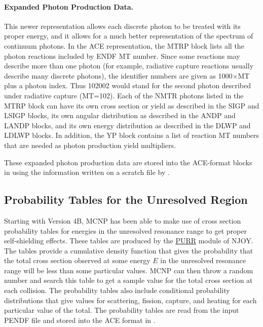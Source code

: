 \paragraph{Expanded Photon Production Data.}
This newer representation allows each discrete photon to be
treated with its proper energy, and it allows for a much better
representation of the spectrum of continuum photons.  In the
ACE representation, the MTRP block lists all the photon
reactions included by ENDF MT number.  Since some reactions
may describe more than one photon (for example, radiative
capture reactions usually describe many discrete photons),
the identifier numbers are given as 1000$\times$MT plus a photon
index.  Thus 102002 would stand for the second photon
described under radiative capture (MT=102).  Each of the
NMTR photons listed in the MTRP block can have its own
cross section or yield as described in the SIGP and LSIGP
blocks, its own angular distribution as described in the
ANDP and LANDP blocks, and its own energy distribution as
described in the DLWP and LDLWP blocks.  In addition,
the YP block contains a list of reaction MT numbers that
are needed as photon production yield multipliers.

These expanded photon production data are stored into the
ACE-format blocks in  using the information
written on a scratch file by .

\subsection{Probability Tables for the Unresolved Region}
\label{ssACER_URR_probtables}

Starting with Version 4B, MCNP has been able to make use of
cross section probability tables for energies in the unresolved
resonance range to get proper
self-shielding effects.  These tables are produced by the
\hyperlink{sPURRhy}{PURR} module of NJOY.  The
tables provide a cumulative density function that gives the
probability that the total cross section observed at some
energy $E$ in the unresolved resonance range will be less
than some particular values.  MCNP can then throw a
random number and search this table to get a
sample value for the total cross section at each collision.  The
probability tables also include conditional
probability distributions that give values for scattering, fission,
capture, and heating for each particular value of the total.  The
probability tables are read from the input PENDF file and stored
into the ACE format in .

